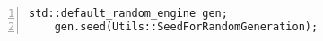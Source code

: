 \begin{lstlisting}[numbers=left,xleftmargin=2em,frame=single,framexleftmargin=2em, breaklines, tabsize=2, title=main.cpp]
	std::default_random_engine gen;
	gen.seed(Utils::SeedForRandomGeneration);
\end{lstlisting}



